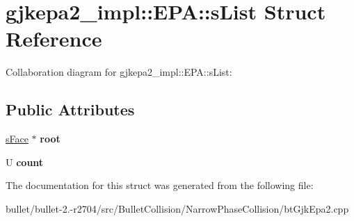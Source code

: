 \hypertarget{structgjkepa2__impl_1_1_e_p_a_1_1s_list}{\section{gjkepa2\+\_\+impl\+:\+:E\+P\+A\+:\+:s\+List Struct Reference}
\label{structgjkepa2__impl_1_1_e_p_a_1_1s_list}
}


Collaboration diagram for gjkepa2\+\_\+impl\+:\+:E\+P\+A\+:\+:s\+List\+:
\subsection*{Public Attributes}
\begin{DoxyCompactItemize}
\item 
\hypertarget{structgjkepa2__impl_1_1_e_p_a_1_1s_list_a856f35452ebca0df771601426fcbb4d6}{\hyperlink{structgjkepa2__impl_1_1_e_p_a_1_1s_face}{s\+Face} $\ast$ {\bfseries root}}\label{structgjkepa2__impl_1_1_e_p_a_1_1s_list_a856f35452ebca0df771601426fcbb4d6}

\item 
\hypertarget{structgjkepa2__impl_1_1_e_p_a_1_1s_list_a7be6d7567e0e23712e37955057be6eff}{U {\bfseries count}}\label{structgjkepa2__impl_1_1_e_p_a_1_1s_list_a7be6d7567e0e23712e37955057be6eff}

\end{DoxyCompactItemize}


The documentation for this struct was generated from the following file\+:\begin{DoxyCompactItemize}
\item 
bullet/bullet-\/2.-\/r2704/src/\+Bullet\+Collision/\+Narrow\+Phase\+Collision/bt\+Gjk\+Epa2.\+cpp\end{DoxyCompactItemize}
